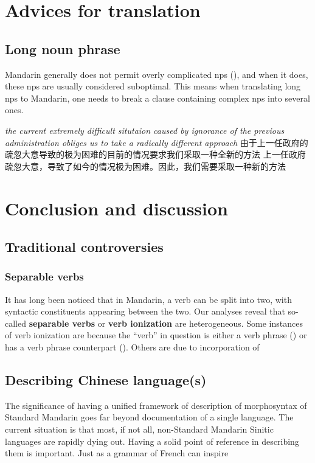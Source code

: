 \documentclass[UTF8, a4paper, oneside, scheme=plain, 12pt]{ctexrep}
\newcommand*{\concept}[1]{\textbf{#1}}
\newcommand{\form}[1]{\emph{#1}}
\begin{document}
\chapter{Advices for translation}

\section{Long noun phrase}\label{sec:translation.long-noun-phrases}

Mandarin generally does not permit overly complicated \acp{np} (),
and when it does, these \acp{np} are usually considered suboptimal.
This means when translating long \acp{np} to Mandarin,
one needs to break a clause containing complex \acp{np} into several ones.

\begin{exe}
    \ex\begin{xlist}
        \ex \form{the current extremely difficult situtaion caused by ignorance of the previous administration obliges us to take a radically different approach}
        \ex 由于上一任政府的疏忽大意导致的极为困难的目前的情况要求我们采取一种全新的方法
        \ex 上一任政府疏忽大意，导致了如今的情况极为困难。因此，我们需要采取一种新的方法
    \end{xlist}
\end{exe}

\chapter{Conclusion and discussion}

\section{Traditional controversies}

\subsection{Separable verbs}

It has long been noticed that in Mandarin,
a verb can be split into two, with syntactic constituents appearing between the two.
Our analyses reveal that so-called \concept{separable verbs} or \concept{verb ionization} are heterogeneous.
Some instances of verb ionization are because the ``verb'' in question
is either a verb phrase () or has a verb phrase counterpart ().
Others are due to incorporation of 

\section{Describing Chinese language(s)}

The significance of having a unified framework of description of morphosyntax of Standard Mandarin
goes far beyond documentation of a single language.
The current situation is that most, if not all, non-Standard Mandarin Sinitic languages
are rapidly dying out.
Having a solid point of reference in describing them is important.
Just as a grammar of French can inspire 

\printbibliography
\end{document}
